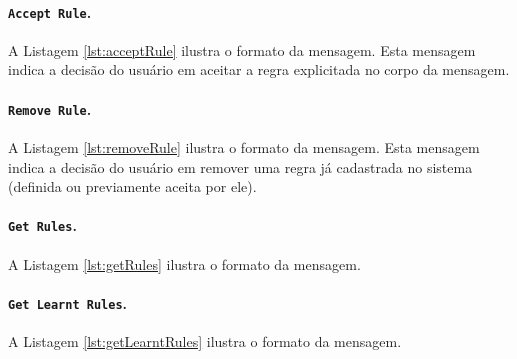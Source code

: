 \noindent
\begin{minipage}[l]{\linewidth}

\end{minipage}

\paragraph*{\texttt{Accept Rule}.} A Listagem \ref{lst:acceptRule} ilustra o formato da mensagem. Esta mensagem indica a decisão do usuário em aceitar a regra explicitada no corpo da mensagem.

\noindent
\begin{minipage}[l]{\linewidth}

\end{minipage}

\paragraph*{\texttt{Remove Rule}.} A Listagem \ref{lst:removeRule} ilustra o formato da mensagem. Esta mensagem indica a decisão do usuário em remover uma regra já cadastrada no sistema (definida ou previamente aceita por ele).

\noindent
\begin{minipage}[l]{\linewidth}

\end{minipage}

\paragraph*{\texttt{Get Rules}.} A Listagem \ref{lst:getRules} ilustra o formato da mensagem.

\noindent
\begin{minipage}[l]{\linewidth}

\end{minipage}

\paragraph*{\texttt{Get Learnt Rules}.} A Listagem \ref{lst:getLearntRules} ilustra o formato da mensagem.

\noindent
\begin{minipage}[l]{\linewidth}

\end{minipage}

